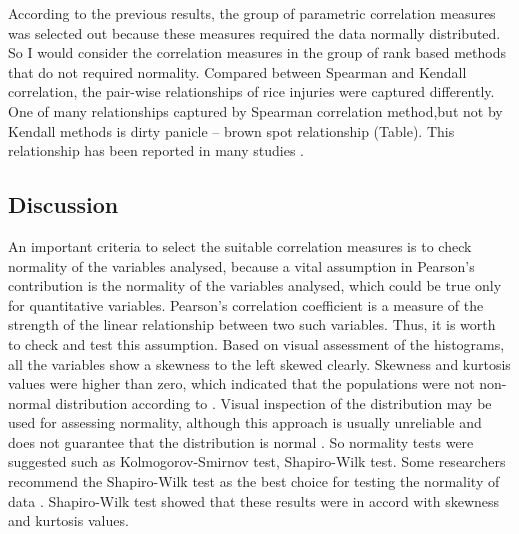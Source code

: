 According to the previous results, the group of parametric correlation measures was selected out because these measures required the data normally distributed. So I would consider the correlation measures in the group of rank based methods that do not required normality. Compared between Spearman and Kendall correlation, the pair-wise relationships of rice injuries were captured differently. One of many relationships captured by Spearman correlation method,but not by Kendall methods is dirty panicle – brown spot relationship (Table). This relationship has been reported in many studies \citep{Ou_1985_Rice, Barnwal_2013_Review}.

\subsection{Discussion}

An important criteria to select the suitable correlation measures is to check normality of the variables analysed, because a vital assumption in Pearson’s contribution is the normality of the variables analysed, which could be true only for quantitative variables. Pearson’s correlation coefficient is a measure of the strength of the linear relationship between two such variables. Thus, it is worth to check and test this assumption. Based on visual assessment of the histograms, all the variables show a skewness to the left skewed clearly. Skewness and kurtosis values were higher than zero, which indicated that the populations were not non-normal distribution  according to \citet{Doane_2011_Measuring}. Visual inspection of the distribution may be used for assessing normality, although this approach is usually unreliable and does not guarantee that the distribution is normal \citep{Ghasemi_2012_Normality}. So normality tests were suggested such as Kolmogorov-Smirnov test, Shapiro-Wilk test. Some researchers recommend the Shapiro-Wilk test as the best choice for testing the normality of data \citep{Peat_2005_Guide}. Shapiro-Wilk test showed that these results were in accord with skewness and kurtosis values.

